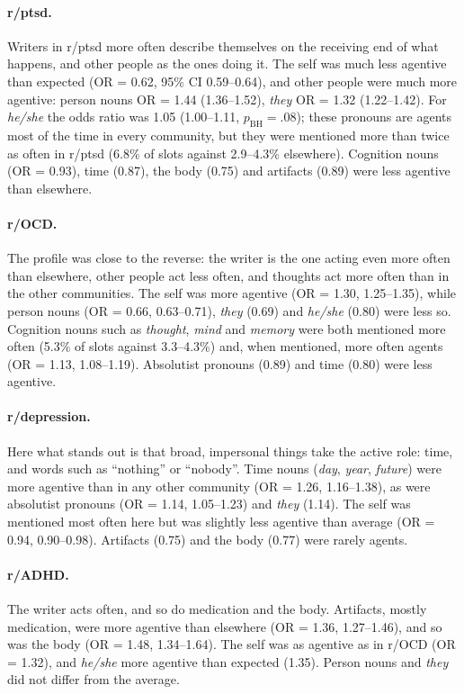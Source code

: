 \documentclass[11pt,a4paper]{article}
\begin{document}
\paragraph{r/ptsd.} Writers in r/ptsd more often describe themselves on the receiving end of what happens, and other people as the ones doing it. The self was much less agentive than expected (OR = 0.62, 95\% CI 0.59--0.64), and other people were much more agentive: person nouns OR = 1.44 (1.36--1.52), \textit{they} OR = 1.32 (1.22--1.42). For \textit{he/she} the odds ratio was 1.05 (1.00--1.11, $p_\mathrm{BH} = .08$); these pronouns are agents most of the time in every community, but they were mentioned more than twice as often in r/ptsd (6.8\% of slots against 2.9--4.3\% elsewhere). Cognition nouns (OR = 0.93), time (0.87), the body (0.75) and artifacts (0.89) were less agentive than elsewhere.

\paragraph{r/OCD.} The profile was close to the reverse: the writer is the one acting even more often than elsewhere, other people act less often, and thoughts act more often than in the other communities. The self was more agentive (OR = 1.30, 1.25--1.35), while person nouns (OR = 0.66, 0.63--0.71), \textit{they} (0.69) and \textit{he/she} (0.80) were less so. Cognition nouns such as \textit{thought}, \textit{mind} and \textit{memory} were both mentioned more often (5.3\% of slots against 3.3--4.3\%) and, when mentioned, more often agents (OR = 1.13, 1.08--1.19). Absolutist pronouns (0.89) and time (0.80) were less agentive.

\paragraph{r/depression.} Here what stands out is that broad, impersonal things take the active role: time, and words such as ``nothing'' or ``nobody''. Time nouns (\textit{day}, \textit{year}, \textit{future}) were more agentive than in any other community (OR = 1.26, 1.16--1.38), as were absolutist pronouns (OR = 1.14, 1.05--1.23) and \textit{they} (1.14). The self was mentioned most often here but was slightly less agentive than average (OR = 0.94, 0.90--0.98). Artifacts (0.75) and the body (0.77) were rarely agents.

\paragraph{r/ADHD.} The writer acts often, and so do medication and the body. Artifacts, mostly medication, were more agentive than elsewhere (OR = 1.36, 1.27--1.46), and so was the body (OR = 1.48, 1.34--1.64). The self was as agentive as in r/OCD (OR = 1.32), and \textit{he/she} more agentive than expected (1.35). Person nouns and \textit{they} did not differ from the average.
\end{document}
